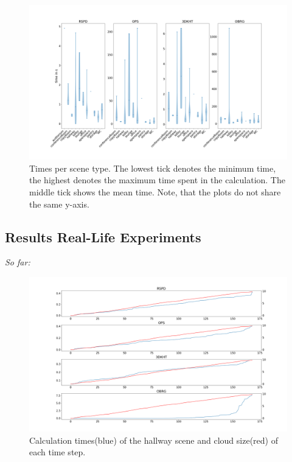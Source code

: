 \documentclass[main.tex]{subfiles}
\begin{document}
\begin{figure}[]
    \centering
    \includegraphics[width=15 cm]{images/times_violin.png}
    \caption[Time Results 2D-3D-S]{Times per scene type. The lowest tick denotes the minimum time, the highest
        denotes the maximum time spent in the calculation. The middle tick shows the mean time.
        Note, that the plots
        do not share the same y-axis.}
    \label{fig:violintime}
\end{figure}

\subsection{Results Real-Life Experiments}
\textit{So far:}

\begin{figure}[]
    \centering
    \includegraphics[width=\textwidth]{images/dyn_time-hallway.png}
    \caption[Time Results Hallway]{Calculation times(blue) of the hallway scene and cloud size(red) of each time step.}
    \label{fig:dynhallway}
\end{figure}
\end{document}
